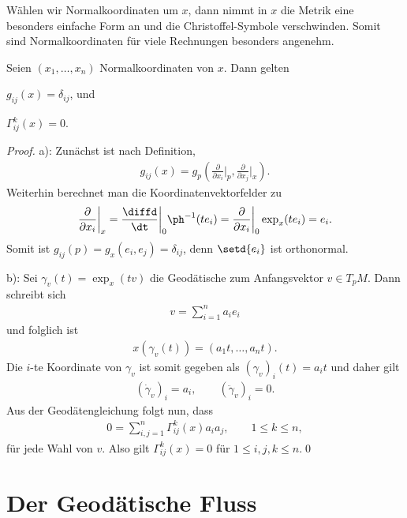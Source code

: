 \documentclass[%
	paper=a5,%
	fleqn,%
	DIV=18,%
	BCOR=0mm,
	fontsize=11pt,
	titlepage=false,%
	bibliography=totoc,
	DIV=18,%
	twoside=true,
	pdftitle=Riemannsche Geometrie,
	pdfauthor=Uwe Semmelmann,
	numbers=noendperiod]%
	{scrbook}
\begin{document}
Wählen wir Normalkoordinaten um $x$, dann nimmt in $x$ die Metrik eine besonders
einfache Form an und die Christoffel-Symbole verschwinden. Somit sind
Normalkoordinaten für viele Rechnungen besonders angenehm.

\begin{prop}
Seien $(x_1,\ldots,x_n)$ Normalkoordinaten von $x$. Dann gelten
\begin{propenum}
\item $g_{ij}(x) = \delta_{ij}$, und
\item $\Gamma_{ij}^k(x) = 0$.\fish
\end{propenum} 
\end{prop}
\begin{proof}
a): Zunächst ist nach Definition,
\begin{align*}
g_{ij}(x) = g_p\left(\frac{\partial}{\partial
x_i}\bigg|_p,\frac{\partial}{\partial x_j}\bigg|_x \right).
\end{align*}
Weiterhin berechnet man die Koordinatenvektorfelder zu
\begin{align*}
\frac{\partial}{\partial x_i}\bigg|_x = \frac{\diffd}{\dt}\bigg|_0 \ph^{-1}(t e_i)
= \frac{\partial}{\partial x_i}\bigg|_0 \exp_x(t e_i) = e_i.
\end{align*}
Somit ist $g_{ij}(p) = g_x(e_i,e_j) = \delta_{ij}$, denn $\setd{e_i}$ ist
orthonormal.

b): Sei $\gamma_v(t) = \exp_x(tv)$ die Geodätische zum Anfangsvektor $v\in
T_pM$. Dann schreibt sich 
\begin{align*}
v = \sum_{i=1}^n a_i e_i
\end{align*}
und folglich ist
\begin{align*}
x(\gamma_v(t)) = (a_1t,\ldots,a_n t).
\end{align*}
Die $i$-te Koordinate von $\gamma_v$ ist somit gegeben als $(\gamma_v)_i(t) =
a_i t$ und daher gilt
\begin{align*}
(\dot{\gamma}_v)_i = a_i,\qquad (\ddot{\gamma}_v)_i = 0.
\end{align*}
Aus der Geodätengleichung folgt nun, dass 
\begin{align*}
0 = \sum_{i,j=1}^n \Gamma_{ij}^k(x) a_i a_j,\qquad 1\le k\le n,
\end{align*}
für jede Wahl von $v$. Also gilt $\Gamma_{ij}^k(x) = 0$ für $1\le i,j,k\le
n$.\qed
\end{proof}

\section{Der Geodätische Fluss}
\end{document}
